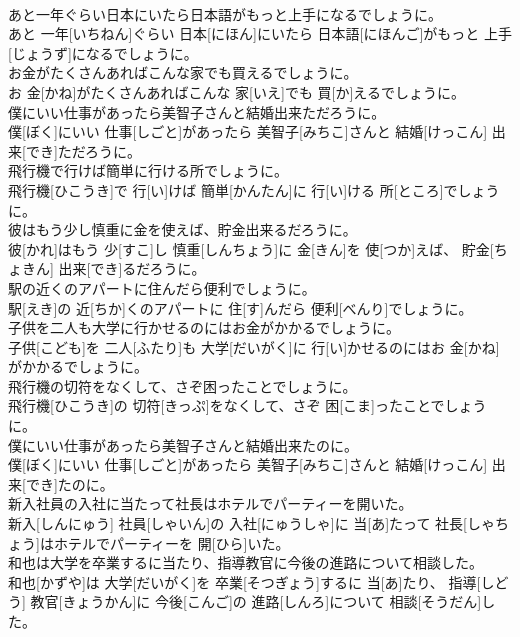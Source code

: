\documentclass[8pt]{extreport}
\begin{document}
\begin{CJK}{UTF8}{min}
\\	あと一年ぐらい日本にいたら日本語がもっと上手になるでしょうに。	
\\	あと 一年[いちねん]ぐらい 日本[にほん]にいたら 日本語[にほんご]がもっと 上手[じょうず]になるでしょうに。
\\	お金がたくさんあればこんな家でも買えるでしょうに。	
\\	お 金[かね]がたくさんあればこんな 家[いえ]でも 買[か]えるでしょうに。
\\	僕にいい仕事があったら美智子さんと結婚出来ただろうに。	
\\	僕[ぼく]にいい 仕事[しごと]があったら 美智子[みちこ]さんと 結婚[けっこん] 出来[でき]ただろうに。
\\	飛行機で行けば簡単に行ける所でしょうに。	
\\	飛行機[ひこうき]で 行[い]けば 簡単[かんたん]に 行[い]ける 所[ところ]でしょうに。
\\	彼はもう少し慎重に金を使えば、貯金出来るだろうに。	
\\	彼[かれ]はもう 少[すこ]し 慎重[しんちょう]に 金[きん]を 使[つか]えば、 貯金[ちょきん] 出来[でき]るだろうに。
\\	駅の近くのアパートに住んだら便利でしょうに。	
\\	駅[えき]の 近[ちか]くのアパートに 住[す]んだら 便利[べんり]でしょうに。
\\	子供を二人も大学に行かせるのにはお金がかかるでしょうに。	
\\	子供[こども]を 二人[ふたり]も 大学[だいがく]に 行[い]かせるのにはお 金[かね]がかかるでしょうに。
\\	飛行機の切符をなくして、さぞ困ったことでしょうに。	
\\	飛行機[ひこうき]の 切符[きっぷ]をなくして、さぞ 困[こま]ったことでしょうに。
\\	僕にいい仕事があったら美智子さんと結婚出来たのに。	
\\	僕[ぼく]にいい 仕事[しごと]があったら 美智子[みちこ]さんと 結婚[けっこん] 出来[でき]たのに。
\\	新入社員の入社に当たって社長はホテルでパーティーを開いた。	
\\	新入[しんにゅう] 社員[しゃいん]の 入社[にゅうしゃ]に 当[あ]たって 社長[しゃちょう]はホテルでパーティーを 開[ひら]いた。
\\	和也は大学を卒業するに当たり、指導教官に今後の進路について相談した。	
\\	和也[かずや]は 大学[だいがく]を 卒業[そつぎょう]するに 当[あ]たり、 指導[しどう] 教官[きょうかん]に 今後[こんご]の 進路[しんろ]について 相談[そうだん]した。

\end{CJK}
\end{document}
